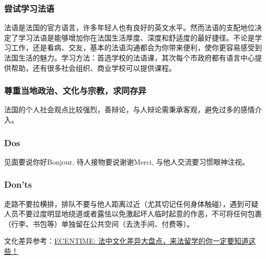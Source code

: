 \subsubsection{尝试学习法语}
法语是法国的官方语言，许多年轻人也有良好的英文水平。然而法语的支配地位决定了学习法语是能够增加你在法国生活厚度、深度和舒适度的最好捷径。不论是学习工作，还是看病、交友，基本的法语沟通都会为你带来便利，使你更容易感受到法国生活的魅力。学习方法：首选学校的法语课，其次每个市政府都有语言中心提供帮助，还有很多社会组织、商业学校可以提供课程。

\subsubsection{尊重当地政治、文化与宗教，求同存异}
法国的个人社会观点比较强烈，善辩论，与人辩论需秉承客观，避免过多的感情介入。

\subsubsection{Dos}
见面要说你好Bonjour, 待人接物要说谢谢Merci, 与他人交流要习惯眼神注视。

\subsubsection{Don'ts}
走路不要拉横排，排队不要与他人距离过近（尤其切记任何身体触碰），遇到可疑人员不要过度明显地绕道或者露怯以免激起坏人临时起意的作恶，不可将任何包裹（行李、书包等）单独留在公共空间（去洗手间、付费等）。

文化差异参考：\href{https://www.ecentime.com/article/difference-culturelle}{ECENTIME: 法中文化差异大盘点，来法留学的你一定要知道这些！}
